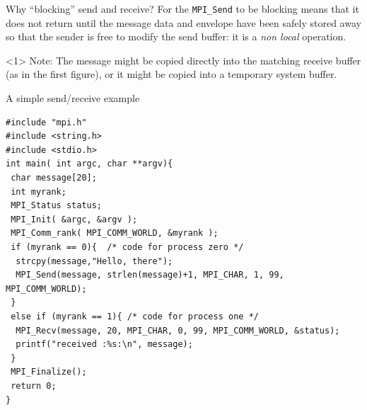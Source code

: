 \documentclass[xcolor={svgnames,usenames}]{beamer}
\begin{document}
\begin{frame}{Why ``blocking'' send and receive?}
	For the \texttt{MPI_Send} to be \alert{blocking} means that it does not return until the message
	data and envelope have been safely stored away so that the sender is free to modify the
	send buffer: it is a \emph{non local} operation. 
	\vfill
	\begin{onlyenv}
	\alert{Note:} The message might be copied directly into the matching receive buffer (as in the first figure), or it
	might be copied into a temporary system buffer.
	\begin{center}
	\end{center}
	\end{onlyenv}
\end{frame}

\begin{frame}[fragile]{A simple send/receive example}
\footnotesize
\begin{verbatim}
#include "mpi.h"
#include <string.h>
#include <stdio.h>
int main( int argc, char **argv){
 char message[20];
 int myrank;
 MPI_Status status;
 MPI_Init( &argc, &argv );
 MPI_Comm_rank( MPI_COMM_WORLD, &myrank );
 if (myrank == 0){  /* code for process zero */
  strcpy(message,"Hello, there");
  MPI_Send(message, strlen(message)+1, MPI_CHAR, 1, 99, MPI_COMM_WORLD);
 }
 else if (myrank == 1){ /* code for process one */
  MPI_Recv(message, 20, MPI_CHAR, 0, 99, MPI_COMM_WORLD, &status);
  printf("received :%s:\n", message);
 }
 MPI_Finalize();
 return 0;
}
\end{verbatim}
\end{frame}
\end{document}
